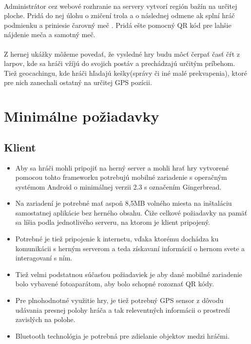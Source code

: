 \paragraph{}
Administrátor cez webové rozhranie na servery vytvorí región bažín na určitej ploche. Pridá do nej úlohu o zničení trola a o následnej odmene ak splní hráč podmienku a priniesie čarovný meč . Pridá ešte pomocný QR kód pre lahšie nájdenie meča a samotný meč.\

\paragraph{}
Z hernej ukážky môžeme povedať, že vysledné hry budu môcť čerpať časť čŕt z larpov, kde sa hráči vžíjú do svojich postáv a prechádzajú určitým príbehom. Tiež geocachingu, kde hráči hľadajú kešky(správy či iné malé prekvapenia), ktoré pre nich zanechali ostatný na určitej GPS pozícii.

\section{Minimálne požiadavky}
\subsection{Klient}
\begin{itemize}
\item Aby sa hráči mohli pripojiť na herný server a mohli hrať hry vytvorené pomocou tohto frameworku potrebujú mobilné zariadenie s operačným systémom Android o minimálnej verzii 2.3 s označením Gingerbread. 
\item Na zariadení je potrebné mať aspoň 8,5MB volného miesta na inštaláciu samostatnej aplikácie bez herného obsahu. Čiže celkové požiadavky na pamäť sa líšia podla jednotlivého serveru, na ktorom je klient pripojený. 
\item Potrebné je tiež pripojenie k internetu, vďaka ktorému dochádza ku komunikácii s herným serverom a teda získavaní informácií o hernom svete a interagovaní s ním. 
\item Tiež velmi podstatnou súčasťou požiadaviek je aby dané mobilné zariadenie bolo vybavené fotoaparátom, aby bolo schopné rozoznať QR kódy. 
\item Pre plnohodnotné využitie hry, je tiež potrebný GPS sensor z dôvodu udávania presnej polohy hráča a tak releventných informácii o prostredí zavislých na polohe. 
\item Bluetooth technológia je potrebná pre zdielanie objektov medzi hráčmi. 
\end{itemize}

